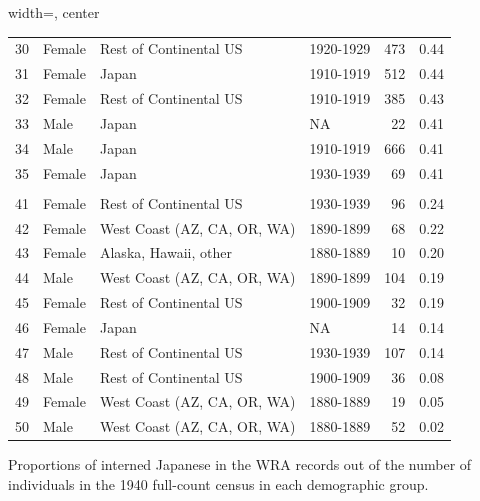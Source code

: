 \documentclass[12pt]{article}
\begin{document}
\begin{table}[!h]
\begin{threeparttable}
\begin{adjustbox}{width=\textwidth, center}
\begin{tabular}[t]{rlllrr}
\hspace{1em}30 & Female & Rest of Continental US & 1920-1929 & 473 & 0.44\\
\hspace{1em}31 & Female & Japan & 1910-1919 & 512 & 0.44\\
\hspace{1em}32 & Female & Rest of Continental US & 1910-1919 & 385 & 0.43\\
\hspace{1em}33 & Male & Japan & NA & 22 & 0.41\\
\hspace{1em}34 & Male & Japan & 1910-1919 & 666 & 0.41\\
\hspace{1em}35 & Female & Japan & 1930-1939 & 69 & 0.41\\
\addlinespace[0.3em]
\multicolumn{6}{l}{\textbf{Least interned}}\\
\hspace{1em}41 & Female & Rest of Continental US & 1930-1939 & 96 & 0.24\\
\hspace{1em}42 & Female & West Coast (AZ, CA, OR, WA) & 1890-1899 & 68 & 0.22\\
\hspace{1em}43 & Female & Alaska, Hawaii, other & 1880-1889 & 10 & 0.20\\
\hspace{1em}44 & Male & West Coast (AZ, CA, OR, WA) & 1890-1899 & 104 & 0.19\\
\hspace{1em}45 & Female & Rest of Continental US & 1900-1909 & 32 & 0.19\\
\hspace{1em}46 & Female & Japan & NA & 14 & 0.14\\
\hspace{1em}47 & Male & Rest of Continental US & 1930-1939 & 107 & 0.14\\
\hspace{1em}48 & Male & Rest of Continental US & 1900-1909 & 36 & 0.08\\
\hspace{1em}49 & Female & West Coast (AZ, CA, OR, WA) & 1880-1889 & 19 & 0.05\\
\hspace{1em}50 & Male & West Coast (AZ, CA, OR, WA) & 1880-1889 & 52 & 0.02\\
\bottomrule
\end{tabular}
\end{adjustbox}
\begin{tablenotes}
\item Proportions of interned Japanese in the WRA records out of the number of individuals in the 1940 full-count census in each demographic group.
\end{tablenotes}
\end{threeparttable}
\end{table}
\end{document}
